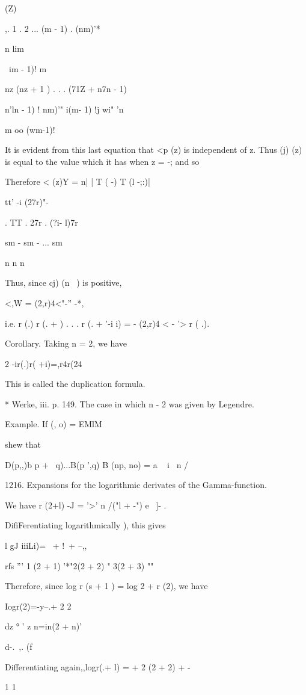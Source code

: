  (Z)

,. 1 . 2 ... (m - 1) . (nm)'*

n lim

\ im - 1)! m

nz (nz + 1 ) . . . (71Z + n7n - 1)

 n'ln - 1) ! nm)'" i(m- 1) !j wi" 'n

m oo (wm-1)!

It is evident from this last equation that <p (z) is independent of z.
Thus (j) (z) is equal to the value which it has when z = -; and so

Therefore < (z)Y = n| | T ( -) T (l -;:)|

tt' -i (27r)"-

. TT . 27r . (?i- l)7r

sm - sm - ... sm

n n n

Thus, since cj) (n~ ) is positive,

<,W = (2,r)4<"-'' -*,

i.e. r (.) r (. + ) . . . r (. + '-i i) = - (2,r)4 < - '> r ( .).

Corollary. Taking n = 2, we have

2 -ir(.)r( +i)=,r4r(24

This is called the duplication formula.

* Werke, iii. p. 149. The case in which n - 2 was given by Legendre.

%
%

Example. If (, o) = EMlM

shew that

D(p,,)b p + \ q)...B(p ',q) B (np, no) = a ~ i \ n /

1216. Expansions for the logarithmic derivates of the Gamma-function.

We have r (2+l) -J = '>' n /("l + -") e~ ]- .

DifiFerentiating logarithmically ), this gives

l gJ iiiLi)= \ + !\ + --,,

rfs ''' 1 (2 + 1) '*"2(2 + 2) " 3(2 + 3) ""

Therefore, since log r (s + 1 ) = log 2 + r (2), we have

Iogr(2)=-y--.+ 2 2

dz ° ' z n=in(2 + n)'

d-. \,,. (f

Differentiating again,,logr(.+ l) = + 2 (2 + 2) + -

1 1


